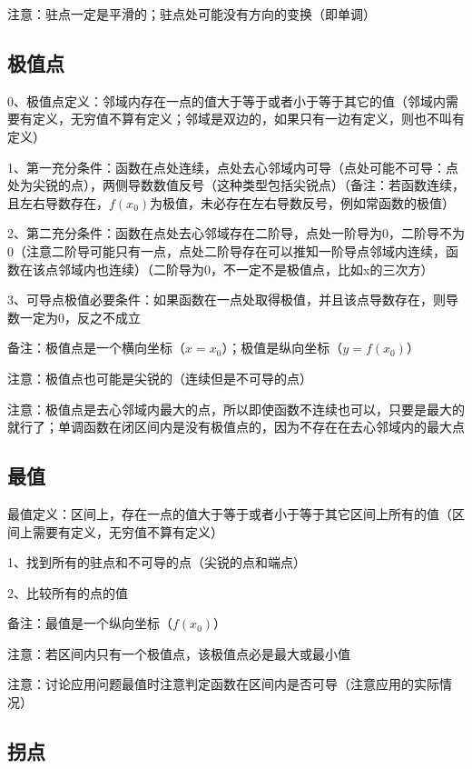 注意：驻点一定是平滑的；驻点处可能没有方向的变换（即单调）



\subsection{极值点}

0、极值点定义：邻域内存在一点的值大于等于或者小于等于其它的值（邻域内需要有定义，无穷值不算有定义；邻域是双边的，如果只有一边有定义，则也不叫有定义）

1、第一充分条件：函数在点处连续，点处去心邻域内可导（点处可能不可导：点处为尖锐的点），两侧导数数值反号（这种类型包括尖锐点）（备注：若函数连续，且左右导数存在，$f(x_0)$为极值，未必存在左右导数反号，例如常函数的极值）

2、第二充分条件：函数在点处去心邻域存在二阶导，点处一阶导为0，二阶导不为0（注意二阶导可能只有一点，点处二阶导存在可以推知一阶导点邻域内连续，函数在该点邻域内也连续）（二阶导为0，不一定不是极值点，比如x的三次方）

3、可导点极值必要条件：如果函数在一点处取得极值，并且该点导数存在，则导数一定为0，反之不成立

备注：极值点是一个横向坐标（$x=x_0$）；极值是纵向坐标（$y=f(x_0)$）

注意：极值点也可能是尖锐的（连续但是不可导的点）

注意：极值点是去心邻域内最大的点，所以即使函数不连续也可以，只要是最大的就行了；单调函数在闭区间内是没有极值点的，因为不存在在去心邻域内的最大点



\subsection{最值}

最值定义：区间上，存在一点的值大于等于或者小于等于其它区间上所有的值（区间上需要有定义，无穷值不算有定义）

1、找到所有的驻点和不可导的点（尖锐的点和端点）

2、比较所有的点的值

备注：最值是一个纵向坐标（$f(x_0)$）

注意：若区间内只有一个极值点，该极值点必是最大或最小值

注意：讨论应用问题最值时注意判定函数在区间内是否可导（注意应用的实际情况）



\subsection{拐点}


